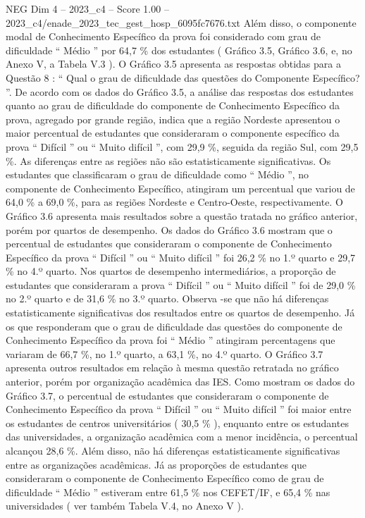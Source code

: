 \begin{textsample}{NEG Dim 4 – 2023\_c4 – Score 1.00 – 2023\_c4/enade\_2023\_tec\_gest\_hosp\_6095fc7676.txt}
Além disso, o componente modal de Conhecimento Específico da prova foi considerado com grau de dificuldade “ Médio ” por 64,7 \% dos estudantes ( Gráfico 3.5, Gráfico 3.6, e, no Anexo V, a Tabela V.3 ).
O Gráfico 3.5 apresenta as respostas obtidas para a Questão 8 : “ Qual o grau de dificuldade das questões do Componente Específico? ”.
De acordo com os dados do Gráfico 3.5, a análise das respostas dos estudantes quanto ao grau de dificuldade do componente de Conhecimento Específico da prova, agregado por grande região, indica que a região Nordeste apresentou o maior percentual de estudantes que consideraram o componente específico da prova “ Difícil ” ou “ Muito difícil ”, com 29,9 \%, seguida da região Sul, com 29,5 \%.
As diferenças entre as regiões não são estatisticamente significativas.
Os estudantes que classificaram o grau de dificuldade como “ Médio ”, no componente de Conhecimento Específico, atingiram um percentual que variou de 64,0 \% a 69,0 \%, para as regiões Nordeste e Centro-Oeste, respectivamente.
O Gráfico 3.6 apresenta mais resultados sobre a questão tratada no gráfico anterior, porém por quartos de desempenho.
Os dados do Gráfico 3.6 mostram que o percentual de estudantes que consideraram o componente de Conhecimento Específico da prova “ Difícil ” ou “ Muito difícil ” foi 26,2 \% no 1.º quarto e 29,7 \% no 4.º quarto.
Nos quartos de desempenho intermediários, a proporção de estudantes que consideraram a prova “ Difícil ” ou “ Muito difícil ” foi de 29,0 \% no 2.º quarto e de 31,6 \% no 3.º quarto.
Observa -se que não há diferenças estatisticamente significativas dos resultados entre os quartos de desempenho.
Já os que responderam que o grau de dificuldade das questões do componente de Conhecimento Específico da prova foi “ Médio ” atingiram percentagens que variaram de 66,7 \%, no 1.º quarto, a 63,1 \%, no 4.º quarto.
O Gráfico 3.7 apresenta outros resultados em relação à mesma questão retratada no gráfico anterior, porém por organização acadêmica das IES.
Como mostram os dados do Gráfico 3.7, o percentual de estudantes que consideraram o componente de Conhecimento Específico da prova “ Difícil ” ou “ Muito difícil ” foi maior entre os estudantes de centros universitários ( 30,5 \% ), enquanto entre os estudantes das universidades, a organização acadêmica com a menor incidência, o percentual alcançou 28,6 \%.
Além disso, não há diferenças estatisticamente significativas entre as organizações acadêmicas.
Já as proporções de estudantes que consideraram o componente de Conhecimento Específico como de grau de dificuldade “ Médio ” estiveram entre 61,5 \% nos CEFET/IF, e 65,4 \% nas universidades ( ver também Tabela V.4, no Anexo V ).

\end{textsample}
